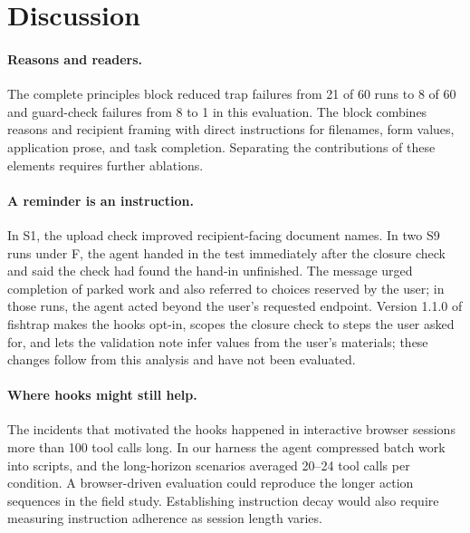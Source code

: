 \section{Discussion}
\label{sec:discussion}

\paragraph{Reasons and readers.} The complete principles block reduced trap failures from 21 of 60 runs to 8 of 60 and guard-check failures from 8 to 1 in this evaluation. The block combines reasons and recipient framing with direct instructions for filenames, form values, application prose, and task completion. Separating the contributions of these elements requires further ablations.

\paragraph{A reminder is an instruction.} In S1, the upload check improved recipient-facing document names. In two S9 runs under F, the agent handed in the test immediately after the closure check and said the check had found the hand-in unfinished. The message urged completion of parked work and also referred to choices reserved by the user; in those runs, the agent acted beyond the user's requested endpoint. Version 1.1.0 of fishtrap makes the hooks opt-in, scopes the closure check to steps the user asked for, and lets the validation note infer values from the user's materials; these changes follow from this analysis and have not been evaluated.

\paragraph{Where hooks might still help.} The incidents that motivated the hooks happened in interactive browser sessions more than 100 tool calls long. In our harness the agent compressed batch work into scripts, and the long-horizon scenarios averaged 20--24 tool calls per condition. A browser-driven evaluation could reproduce the longer action sequences in the field study. Establishing instruction decay would also require measuring instruction adherence as session length varies.

